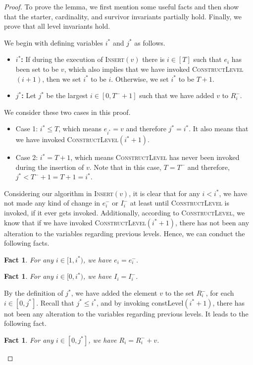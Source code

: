 \documentclass[11pt]{article}
\newtheorem{fact}[theorem]{Fact}
\newcommand{\constLevel}{\textsc{ConstructLevel}}
\newcommand{\insertv}{{\textsc{Insert}}}
\begin{document}
\begin{proof}
To prove the lemma, we first mention some useful facts and then show that the starter, cardinality, and survivor invariants partially hold. Finally, we prove that all level invariants hold.

We begin with defining variables $i^*$ and $j^*$ as follows.


\begin{itemize}
    \item \textbf{$i^*$: } If during the execution of \insertv$(v)$ there is  $i\in [T]$ such that $e_{i}$ has been set to be $v$, which also implies that we have invoked \constLevel $(i + 1)$, then we set $i^*$ to be $i$. Otherwise, we set $i^*$ to be $T + 1$. 
    \item \textbf{$j^*$: } Let $j^*$ be the largest $i\in [0, T^-+1]$ such that we have added $v$ to $R_i^-$.
\end{itemize}

We consider these two cases in this proof. 
\begin{itemize}
    \item Case 1: $i^* \leq T$, which means $e_{i^*} = v$ and therefore $j^* = i^*$. It also means that we have invoked \constLevel $(i^* + 1)$.
    \item Case 2: $i^* = T + 1$, which means \constLevel{} has never been invoked  during the insertion of $v$.
    Note that in this case, $T = T^-$ and therefore, $j^* < T^-+1 = T+1 =i^*$.
\end{itemize}

Considering our algorithm in \insertv$(v)$, 
it is clear that for any $i < i^*$, we have not made any kind of change in $e_i^-$ or $I^-_i$ at least until \constLevel{} is invoked, if it ever gets invoked. 
Additionally, according to \constLevel, we know that if we have invoked \constLevel$(i^* + 1)$, there has not been any alteration to the variables regarding previous levels. 
Hence, we can conduct the following facts.

\begin{fact}
\label{fact:cardinality:iprev:e}
For any $i \in [1, i^*)$, we have $e_i = e_i^-$.
\end{fact}

\begin{fact}
\label{fact:cardinality:iprev:I}
For any $i \in [0, i^*)$, we have $I_i = I_i^-$.
\end{fact}

By the definition of $j^*$, we have added the element $v$ to the set $R_i^-$, for each $i \in [0, j^*]$.
Recall that $j^* \leq i^*$, and by invoking constLevel$(i^* + 1)$, there has not been any alteration to the variables regarding previous levels. It leads to the following fact.
\begin{fact}
\label{fact:cardinality:iprev:R+v}
For any $i \in [0, j^*]$, we have $R_i = R_i^- + v$.
\end{fact}


\end{proof}
\end{document}
